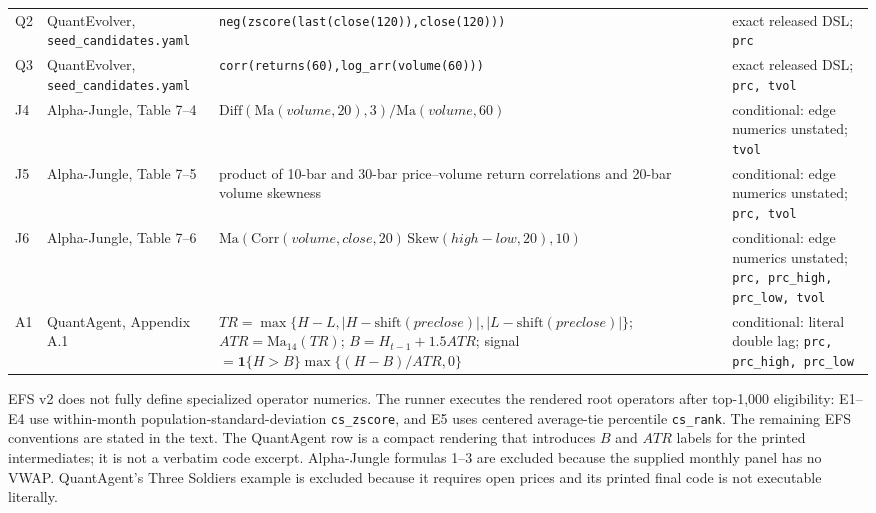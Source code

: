 \begin{table}[t]
\begin{tabular}{@{}p{}p{}p{}p{}@{}}
Q2 & QuantEvolver, \texttt{seed\_candidates.yaml} & \texttt{neg(zscore(last(close(120)),close(120)))} & exact released DSL; \texttt{prc} \\
Q3 & QuantEvolver, \texttt{seed\_candidates.yaml} & \texttt{corr(returns(60),log\_arr(volume(60)))} & exact released DSL; \texttt{prc, tvol} \\
J4 & Alpha-Jungle, Table 7--4 & $\mathrm{Diff}(\mathrm{Ma}(volume,20),3)/\mathrm{Ma}(volume,60)$ & conditional: edge numerics unstated; \texttt{tvol} \\
J5 & Alpha-Jungle, Table 7--5 & product of 10-bar and 30-bar price--volume return correlations and 20-bar volume skewness & conditional: edge numerics unstated; \texttt{prc, tvol} \\
J6 & Alpha-Jungle, Table 7--6 & $\mathrm{Ma}(\mathrm{Corr}(volume,close,20)\,\mathrm{Skew}(high-low,20),10)$ & conditional: edge numerics unstated; \texttt{prc, prc\_high, prc\_low, tvol} \\
A1 & QuantAgent, Appendix A.1 & $TR=\max\{H-L,|H-\mathrm{shift}(preclose)|,|L-\mathrm{shift}(preclose)|\}$; $ATR=\mathrm{Ma}_{14}(TR)$; $B=H_{t-1}+1.5ATR$; signal $=\mathbf{1}\{H>B\}\max\{(H-B)/ATR,0\}$ & conditional: literal double lag; \texttt{prc, prc\_high, prc\_low} \\
\bottomrule
\end{tabular}
\par\vspace{0.2em}\footnotesize EFS v2 does not fully define specialized operator numerics. The runner executes the rendered root operators after top-1,000 eligibility: E1--E4 use within-month population-standard-deviation \texttt{cs\_zscore}, and E5 uses centered average-tie percentile \texttt{cs\_rank}. The remaining EFS conventions are stated in the text. The QuantAgent row is a compact rendering that introduces $B$ and $ATR$ labels for the printed intermediates; it is not a verbatim code excerpt. Alpha-Jungle formulas 1--3 are excluded because the supplied monthly panel has no VWAP. QuantAgent's Three Soldiers example is excluded because it requires open prices and its printed final code is not executable literally.
\end{table}
